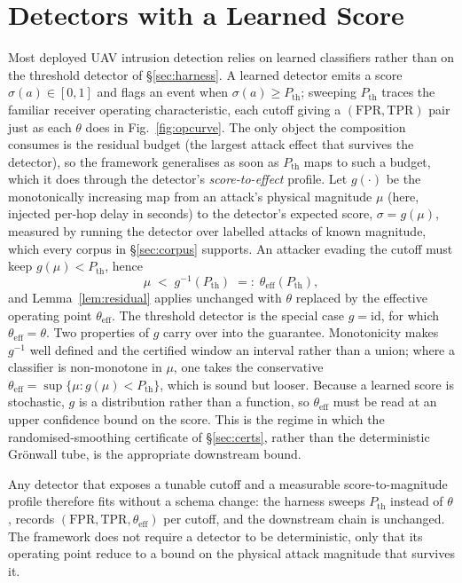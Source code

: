 \section{Detectors with a Learned Score}
\label{app:learned}
\label{sec:roc}
Most deployed UAV intrusion detection relies on learned classifiers rather than
on the threshold detector of \S\ref{sec:harness}. A learned detector emits a
score $\sigma(a)\in[0,1]$ and flags an event when $\sigma(a)\ge P_{\mathrm{th}}$;
sweeping $P_{\mathrm{th}}$ traces the familiar receiver operating
characteristic, each cutoff giving a $(\mathrm{FPR},\mathrm{TPR})$ pair just as
each $\theta$ does in Fig.~\ref{fig:opcurve}. The only object the composition
consumes is the residual budget (the largest attack effect that survives the
detector), so the framework generalises as soon as $P_{\mathrm{th}}$ maps to
such a budget, which it does through the detector's \emph{score-to-effect}
profile. Let $g(\cdot)$ be the monotonically increasing map from an attack's
physical magnitude $\mu$ (here, injected per-hop delay in seconds) to the
detector's expected score, $\sigma=g(\mu)$, measured by running the detector
over labelled attacks of known magnitude, which every corpus in
\S\ref{sec:corpus} supports. An attacker evading the cutoff must keep
$g(\mu)<P_{\mathrm{th}}$, hence
\begin{equation}
\label{eq:pth}
\mu \;<\; g^{-1}(P_{\mathrm{th}}) \;=:\; \theta_{\mathrm{eff}}(P_{\mathrm{th}}),
\end{equation}
and Lemma~\ref{lem:residual} applies unchanged with $\theta$ replaced by the
effective operating point $\theta_{\mathrm{eff}}$. The threshold detector is the
special case $g=\mathrm{id}$, for which $\theta_{\mathrm{eff}}=\theta$. Two
properties of $g$ carry over into the guarantee. Monotonicity makes $g^{-1}$
well defined and the certified window an interval rather than a union; where a
classifier is non-monotone in $\mu$, one takes the conservative
$\theta_{\mathrm{eff}}=\sup\{\mu: g(\mu)<P_{\mathrm{th}}\}$, which is sound but
looser. Because a learned score is stochastic, $g$ is a
distribution rather than a function, so $\theta_{\mathrm{eff}}$ must be read at
an upper confidence bound on the score. This is the regime in which the
randomised-smoothing certificate of \S\ref{sec:certs}, rather than the
deterministic Gr\"onwall tube, is the appropriate downstream bound.

Any detector that exposes a tunable cutoff and a measurable score-to-magnitude
profile therefore fits without a schema change: the harness sweeps
$P_{\mathrm{th}}$ instead of $\theta$, records
$(\mathrm{FPR},\mathrm{TPR},\theta_{\mathrm{eff}})$ per cutoff, and the
downstream chain is unchanged. The framework does not require a detector to be
deterministic, only that its operating point reduce to a bound on the physical
attack magnitude that survives it.

